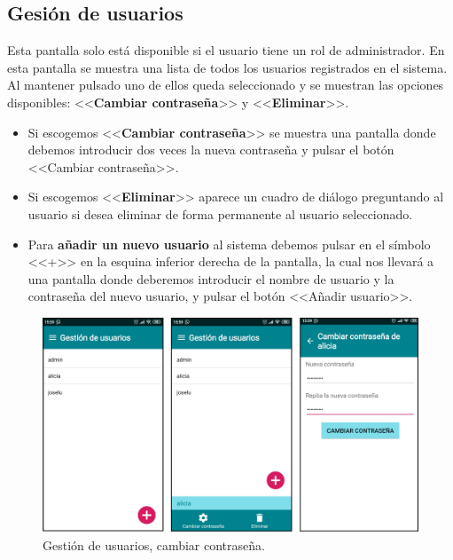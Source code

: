 \subsection{Gesión de usuarios}

Esta pantalla solo está disponible si el usuario tiene un rol de administrador. En esta pantalla se muestra una lista de todos los usuarios registrados en el sistema. Al mantener pulsado uno de ellos queda seleccionado y se muestran las opciones disponibles: <<\textbf{Cambiar contraseña}>> y <<\textbf{Eliminar}>>.

\begin{itemize}
	\item Si escogemos <<\textbf{Cambiar contraseña}>> se muestra una pantalla donde debemos introducir dos veces la nueva contraseña y pulsar el botón <<Cambiar contraseña>>.
	\item Si escogemos <<\textbf{Eliminar}>> aparece un cuadro de diálogo preguntando al usuario si desea eliminar de forma permanente al usuario seleccionado. 
	\item Para \textbf{añadir un nuevo usuario} al sistema debemos pulsar en el símbolo <<+>> en la esquina inferior derecha de la pantalla, la cual nos llevará a una pantalla donde deberemos introducir el nombre de usuario y la contraseña del nuevo usuario, y pulsar el botón <<Añadir usuario>>. 
\end{itemize}  

\begin{figure}[H]
	\centering
	\includegraphics[width=1\textwidth]{../img/gestiondeusuarios.png}
	\caption{Gestión de usuarios, cambiar contraseña.}
	\label{fig:gestiondeusuarios}
\end{figure}

